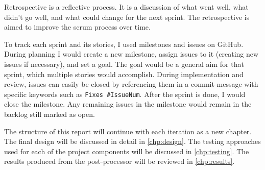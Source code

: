 Retrospective is a reflective process. It is a discussion of what went well, what didn't go well, and what could change for the next sprint. The retrospective is aimed to improve the scrum process over time.

To track each sprint and its stories, I used milestones and issues on GitHub\cite{GitHubMilestones}. During planning I would create a new milestone, assign issues to it (creating new issues if necessary), and set a goal. The goal would be a general aim for that sprint, which multiple stories would accomplish. During implementation and review, issues can easily be closed by referencing them in a commit message with specific keywords such as \texttt{Fixes \#IssueNum}\cite{GitHubCloseIssueCommit}. After the sprint is done, I would close the milestone. Any remaining issues in the milestone would remain in the backlog still marked as open.

The structure of this report will continue with each iteration as a new chapter. The final design will be discussed in detail in \autoref{chp:design}. The testing approaches used for each of the project components will be discussed in \autoref{chp:testing}. The results produced from the post-processor will be reviewed in \autoref{chp:results}.

